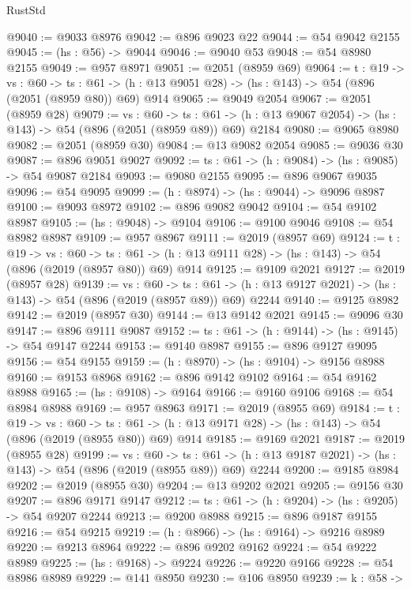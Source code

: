 \begin{lexlean}{RustStd}
\begin{coremodule}
@9040 := @9033 @8976
@9042 := @896 @9023 @22
@9044 := @54 @9042 @2155
@9045 := (hs : @56) -> @9044
@9046 := @9040 @53
@9048 := @54 @8980 @2155
@9049 := @957 @8971
@9051 := @2051 (@8959 @69)
@9064 := {t : @19} ->
  {vs : @60} ->
  {ts : @61} -> (h : @13 @9051 @28) -> (hs : @143) -> @54 (@896 (@2051 (@8959 @80)) @69) @914
@9065 := @9049 @2054
@9067 := @2051 (@8959 @28)
@9079 := {vs : @60} ->
  {ts : @61} -> (h : @13 @9067 @2054) -> (hs : @143) -> @54 (@896 (@2051 (@8959 @89)) @69) @2184
@9080 := @9065 @8980
@9082 := @2051 (@8959 @30)
@9084 := @13 @9082 @2054
@9085 := @9036 @30
@9087 := @896 @9051 @9027
@9092 := {ts : @61} -> (h : @9084) -> (hs : @9085) -> @54 @9087 @2184
@9093 := @9080 @2155
@9095 := @896 @9067 @9035
@9096 := @54 @9095
@9099 := (h : @8974) -> (hs : @9044) -> @9096 @8987
@9100 := @9093 @8972
@9102 := @896 @9082 @9042
@9104 := @54 @9102 @8987
@9105 := (hs : @9048) -> @9104
@9106 := @9100 @9046
@9108 := @54 @8982 @8987
@9109 := @957 @8967
@9111 := @2019 (@8957 @69)
@9124 := {t : @19} ->
  {vs : @60} ->
  {ts : @61} -> (h : @13 @9111 @28) -> (hs : @143) -> @54 (@896 (@2019 (@8957 @80)) @69) @914
@9125 := @9109 @2021
@9127 := @2019 (@8957 @28)
@9139 := {vs : @60} ->
  {ts : @61} -> (h : @13 @9127 @2021) -> (hs : @143) -> @54 (@896 (@2019 (@8957 @89)) @69) @2244
@9140 := @9125 @8982
@9142 := @2019 (@8957 @30)
@9144 := @13 @9142 @2021
@9145 := @9096 @30
@9147 := @896 @9111 @9087
@9152 := {ts : @61} -> (h : @9144) -> (hs : @9145) -> @54 @9147 @2244
@9153 := @9140 @8987
@9155 := @896 @9127 @9095
@9156 := @54 @9155
@9159 := (h : @8970) -> (hs : @9104) -> @9156 @8988
@9160 := @9153 @8968
@9162 := @896 @9142 @9102
@9164 := @54 @9162 @8988
@9165 := (hs : @9108) -> @9164
@9166 := @9160 @9106
@9168 := @54 @8984 @8988
@9169 := @957 @8963
@9171 := @2019 (@8955 @69)
@9184 := {t : @19} ->
  {vs : @60} ->
  {ts : @61} -> (h : @13 @9171 @28) -> (hs : @143) -> @54 (@896 (@2019 (@8955 @80)) @69) @914
@9185 := @9169 @2021
@9187 := @2019 (@8955 @28)
@9199 := {vs : @60} ->
  {ts : @61} -> (h : @13 @9187 @2021) -> (hs : @143) -> @54 (@896 (@2019 (@8955 @89)) @69) @2244
@9200 := @9185 @8984
@9202 := @2019 (@8955 @30)
@9204 := @13 @9202 @2021
@9205 := @9156 @30
@9207 := @896 @9171 @9147
@9212 := {ts : @61} -> (h : @9204) -> (hs : @9205) -> @54 @9207 @2244
@9213 := @9200 @8988
@9215 := @896 @9187 @9155
@9216 := @54 @9215
@9219 := (h : @8966) -> (hs : @9164) -> @9216 @8989
@9220 := @9213 @8964
@9222 := @896 @9202 @9162
@9224 := @54 @9222 @8989
@9225 := (hs : @9168) -> @9224
@9226 := @9220 @9166
@9228 := @54 @8986 @8989
@9229 := @141 @8950
@9230 := @106 @8950
@9239 := {k : @58} ->

\end{coremodule}
\end{lexlean}
